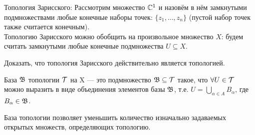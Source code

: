 \begin{example}
    Топология Зарисского: Рассмотрим множество $\mathbb{C}^1$ и назовём в нём замкнутыми подмножествами любые конечные наборы точек: $\{z_1, \ldots, z_n\}$ (пустой набор точек также считается конечным). \\
    Топологию Зарисского можно обобщить на произвольное множество $X$: будем считать замкнутыми любые конечные подмножества $U \subseteq X$.
    \end{example}
\begin{exercise}
    Доказать, что топология Зарисского действительно является топологией.
\end{exercise}

\begin{definition}
    База $\mathfrak{B}$ топологии $\mathcal{T}$ на X --- это подмножество $\mathfrak{B} \subseteq \mathcal{T}$ такое, что $\forall U \in \mathcal{T}$ можно выразить в виде объединения элементов базы $\mathfrak{B}$, т.е. $U = \bigcup_{\alpha \in A} B_{\alpha}$, где $B_{\alpha} \in \mathfrak{B}$.
\end{definition}

База топологии позволяет уменьшить количество изначально задаваемых открытых множеств, определяющих топологию.

